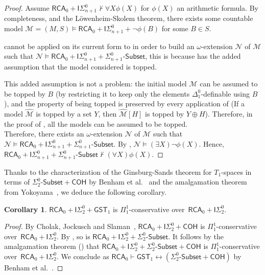 \documentclass{article}
\def\N{\mathcal{N}}
\def\M{\mathcal{M}}
\newcommand{\ISig}{\mathsf{I}\Sigma^0}
\newcommand{\Sub}[1]{{#1}\mbox{-}\mathsf{Subset}}
\newcommand{\RCA}{\mathsf{RCA}}
\newcommand{\COH}{\mathsf{COH}}
\newcommand{\GST}{\mathsf{GST}_1}
\numberwithin{theorem}{section}
\theoremstyle{definition}
\newtheorem{corollary}[theorem]{Corollary}
\begin{document}
\begin{proof}
Assume $\RCA_0 + \ISig_{n+1} \not \vdash \forall X \phi(X)$ for $\phi(X)$ an arithmetic formula. By completeness, and the L\"owenheim-Skolem theorem, there exists some countable model $\M = (M,S) \models \RCA_0 + \ISig_{n+1} + \neg \phi(B)$ for some $B \in S$.

 cannot be applied on its current form to  in order to build an $\omega$-extension $\N$ of $\M$ such that $\N \models \RCA_0 + \ISig_{n+1} + \Sub{\Sigma^0_{n+1}}$, this is because  has the added assumption that the model considered is topped. 

This added assumption is not a problem: the initial model $\M$ can be assumed to be topped by $B$ (by restricting it to keep only the elements $\Delta_1^0$-definable using $B$), and the property of being topped is preserved by every application of  (If a model $\hat{\M}$ is topped by a set $Y$, then $\hat{\M}[H]$ is topped by $Y \oplus H$). Therefore, in the proof of , all the models can be assumed to be topped. \\

Therefore, there exists an $\omega$-extension $\N$ of $\M$ such that $\N \models \RCA_0 + \ISig_{n+1} + \Sub{\Sigma^0_{n+1}}$. By , $\N \models (\exists X) \neg \phi(X)$. Hence, $\RCA_0 + \ISig_{n+1} + \Sub{\Sigma^0_{n+1}} \not \vdash (\forall X)\phi(X)$.
\end{proof}

Thanks to the characterization of the Ginsburg-Sands theorem for $T_1$-spaces in terms of $\Sub{\Sigma^0_2} + \COH$ by Benham et al.~\cite{benham2024ginsburg} and the amalgamation theorem from Yokoyama~\cite{yokoyama2010conservativity}, we deduce the following corollary.

\begin{corollary}
$\RCA_0 + \ISig_2 + \GST$ is $\Pi^1_1$-conservative over~$\RCA_0 + \ISig_2$.
\end{corollary}
\begin{proof}
By Cholak, Jockusch and Slaman~\cite{cholak2001strength}, $\RCA_0 + \ISig_2 + \COH$ is $\Pi^1_1$-conservative over~$\RCA_0 + \ISig_2$. By , so is $\RCA_0 + \ISig_2 + \Sub{\Sigma^0_2}$.
It follows by the amalgamation theorem () that $\RCA_0 + \ISig_2 + \Sub{\Sigma^0_2} + \COH$ is $\Pi^1_1$-conservative over~$\RCA_0 + \ISig_2$. We conclude as $\RCA_0 \vdash \GST \leftrightarrow (\Sub{\Sigma^0_2} + \COH)$ by Benham et al.~\cite{benham2024ginsburg}.
\end{proof}
\end{document}
